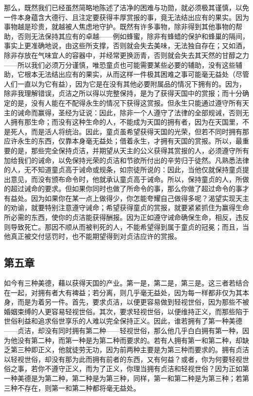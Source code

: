 那么，既然我们已经虽然简略地陈述了洁净的困难与功勋，就必须极其谨慎，以免一件本身蕴含大德行、且注定要获得丰厚赏报的事，竟无法结出应有的果实。因为事物越是珍贵，就越被人焦虑地守护。既然有许多事物，除非得到其他事物的帮助，否则无法保持其应有的卓越——例如蜂蜜，除非有蜂蜡的保护和蜂巢的隔间，事实上更准确地说，由这些所支撑，否则就会失去美味，无法独自存在；又如酒，除非存放在气味宜人的容器中，并经常更换沥青，否则就会失去其天然的甘醇之力——所以我们必须万分谨慎，唯恐童贞也可能需要某些必要的辅助，没有这些辅助，它根本无法结出应有的果实，从而这样一件极其困难之事可能毫无益处（尽管人们一直以为它有益），因为它是在没有其他必要附属品的情况下拥有的。因为，除非我理解错误，贞洁之所以得以完整保持，是为了获得天国中的赏报；而十分确定的是，没有人能在不配得永生的情况下获得这赏报。但永生只能通过遵守所有天主的诫命而赢得，圣经为证说：因此，除非一个人遵守了法律的全部规诫，否则无人拥有那生命；而没有这种生命的人，不能成为天国的拥有者，因为在天国里，不是死人，而是活人将统治。因此，童贞虽希望获得天国的光荣，但若不同时拥有那应许永生的东西，仅靠本身毫无益处；借着永生，才拥有天国的赏报。所以，最重要的是，那些完全保持贞洁，并期望从天主的公义获得其赏报的人，必须遵守所有加给我们的诫命，以免保持光荣的贞洁和节欲所付出的辛劳归于徒然。凡熟悉法律的人，无不知道童贞高于诫命或规条，如宗徒所说的：因此，当他仅就保持童贞提出意见，而没有颁布命令时，他就承认童贞高于诫命。所以，保持童贞的人，所做的超过诫命的要求。但如果你同时也做了所命令的事，那么你做了超过命令的事才有益处。因为如果你在某一点上做得少，你怎能夸耀自己做得多呢？渴望实现天主的劝谕，就要特别注意遵守诫命；希望获得童贞的赏报，就要紧紧抓住为赢得生命所必需的东西，使你的贞洁能获得酬报。因为正如遵守诫命确保生命，相反，违反则导致死亡。那因不顺从而被判死的人，不能希望得到属于童贞的冠冕；而且，当他真正被交付惩罚时，也不能期望得到对贞洁应许的赏报。\par


\subsection{第五章}

如今有三种美德，藉以获得天国的产业。第一是，第二是，第三是。这三者若结合在一起，对拥有者大有裨益；若分离，则几乎毫无益处，因为每一样都非仅为其本身，而是为着另一件。首先，要求贞洁，以便更容易做到轻视世俗，因为那些不被婚姻束缚的人更容易轻视世俗。其次，要求轻视世俗，以便维持正义，而那些陷于世俗利益和追求俗世享乐的人难以完全保持正义。因此，谁若拥有了第一种美德——贞洁，却没有同时拥有第二种——轻视世俗，那么他几乎白白拥有第一种，因为他没有第二种，而第一种是为第二种而要求的。若有人拥有第一和第二种，却缺乏第三种即正义，他就徒劳无功，因为前两种主要是为第三种而要求的。拥有贞洁以轻视世俗，却没有那为此而拥有前者的东西，又有何益？或者，你为何要轻视世俗之事，若你不遵守正义，而为了正义，你理当拥有贞洁和轻视世俗？因为正如第一种美德是为第二种，第二种是为第三种，同样，第一和第二种是为第三种；若第三种不存在，则第一和第二种都将毫无益处。\par

